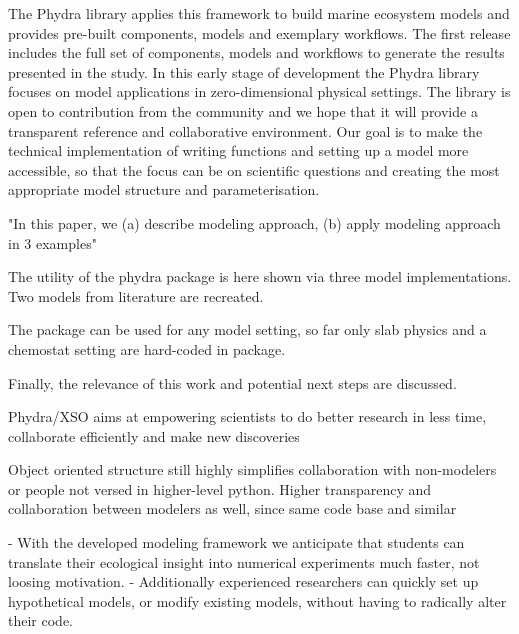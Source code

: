 \documentclass[journal abbreviation, manuscript]{copernicus}
\begin{document}
The Phydra library applies this framework to build marine ecosystem models and provides pre-built components, models and exemplary workflows. The first release includes the full set of components, models and workflows to generate the results presented in the study. In this early stage of development the Phydra library focuses on model applications in zero-dimensional physical settings. 
The library is open to contribution from the community and we hope that it will provide a transparent reference and collaborative environment. Our goal is to make the technical implementation of writing functions and setting up a model more accessible, so that the focus can be on scientific questions and creating the most appropriate model structure and parameterisation.



"In this paper, we (a) describe modeling approach, (b) apply modeling approach in 3 examples"

The utility of the phydra package is here shown via three model implementations. Two models from literature are recreated.

The package can be used for any model setting, so far only slab physics and a chemostat setting are hard-coded in package.

Finally, the relevance of this work and potential next steps are discussed.

Phydra/XSO aims at empowering scientists to do better research in less time, collaborate efficiently and make new discoveries









Object oriented structure still highly simplifies collaboration with non-modelers or people not versed in higher-level python. Higher transparency and collaboration between modelers as well, since same code base and similar 


- With the developed modeling framework we anticipate that students can translate their ecological insight into numerical experiments much faster, not loosing motivation.
- Additionally experienced researchers can quickly set up hypothetical models, or modify existing models, without having to radically alter their code.
\end{document}

